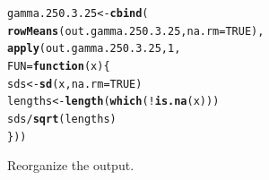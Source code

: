 \documentclass[11pt]{article}\usepackage[]{graphicx}\usepackage[]{color}
\makeatletter
\newcommand{\hlnum}[1]{\textcolor[rgb]{0.686,0.059,0.569}{#1}}%
\newcommand{\hlopt}[1]{\textcolor[rgb]{0,0,0}{#1}}%
\newcommand{\hlstd}[1]{\textcolor[rgb]{0.345,0.345,0.345}{#1}}%
\newcommand{\hlkwa}[1]{\textcolor[rgb]{0.161,0.373,0.58}{\textbf{#1}}}%
\newcommand{\hlkwb}[1]{\textcolor[rgb]{0.69,0.353,0.396}{#1}}%
\newcommand{\hlkwc}[1]{\textcolor[rgb]{0.333,0.667,0.333}{#1}}%
\newcommand{\hlkwd}[1]{\textcolor[rgb]{0.737,0.353,0.396}{\textbf{#1}}}%
\newenvironment{kframe}{%
 \def\at@end@of@kframe{}%
 \ifinner\ifhmode%
  \def\at@end@of@kframe{\end{minipage}}%
  \begin{minipage}{\columnwidth}%
 \fi\fi%
 \def\FrameCommand##1{\hskip\@totalleftmargin \hskip-\fboxsep
 \colorbox{shadecolor}{##1}\hskip-\fboxsep
     \hskip-\linewidth \hskip-\@totalleftmargin \hskip\columnwidth}%
 \MakeFramed {\advance\hsize-\width
   \@totalleftmargin\z@ \linewidth\hsize
   \@setminipage}}%
 {\par\unskip\endMakeFramed%
 \at@end@of@kframe}
\newenvironment{knitrout}{}{} %
\makeatother
\begin{document}
\begin{knitrout}
\color{fgcolor}\begin{kframe}
\begin{alltt}
\hlstd{gamma.250.3.25} \hlkwb{<-} \hlkwd{cbind}\hlstd{(}
  \hlkwd{rowMeans}\hlstd{(out.gamma.250.3.25,} \hlkwc{na.rm} \hlstd{=} \hlnum{TRUE}\hlstd{),}
  \hlkwd{apply}\hlstd{(out.gamma.250.3.25,} \hlnum{1}\hlstd{,}
  \hlkwc{FUN} \hlstd{=} \hlkwa{function}\hlstd{(}\hlkwc{x}\hlstd{)\{}
    \hlstd{sds} \hlkwb{<-} \hlkwd{sd}\hlstd{(x,} \hlkwc{na.rm} \hlstd{=} \hlnum{TRUE}\hlstd{)}
    \hlstd{lengths} \hlkwb{<-} \hlkwd{length}\hlstd{(}\hlkwd{which}\hlstd{(}\hlopt{!}\hlkwd{is.na}\hlstd{(x)))}
    \hlstd{sds} \hlopt{/} \hlkwd{sqrt}\hlstd{(lengths)}
  \hlstd{\}))}
\end{alltt}
\end{kframe}
\end{knitrout}

Reorganize the output.
\end{document}
